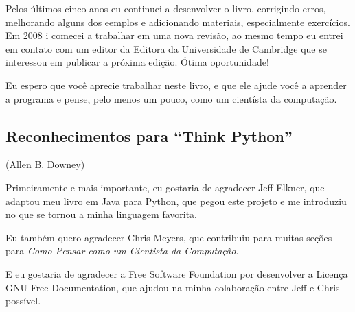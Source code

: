 Pelos últimos cinco anos eu continuei a desenvolver o livro, corrigindo erros, 
melhorando alguns dos eemplos e adicionando materiais, especialmente 
exercícios. Em 2008 i comecei a trabalhar em uma nova revisão, ao mesmo 
tempo eu entrei em contato com um editor da Editora da Universidade de 
Cambridge que se interessou em publicar a próxima edição. Ótima oportunidade!


Eu espero que você aprecie trabalhar neste livro, e que ele ajude você a 
aprender a programa e pense, pelo menos um pouco, como um cientísta da 
computação.

\subsection*{Reconhecimentos para ``Think Python''}

(Allen B. Downey)


Primeiramente e mais importante, eu gostaria de agradecer Jeff Elkner, 
que adaptou meu livro em Java para Python, que pegou este projeto e me 
introduziu no que se tornou a minha linguagem favorita.


Eu também quero agradecer Chris Meyers, que contribuiu para muitas seções 
para \emph{Como Pensar como um Cientista da Computação}.


E eu gostaria de agradecer a Free Software Foundation por desenvolver a 
Licença GNU Free Documentation, que ajudou na minha colaboração entre Jeff 
e Chris possível.


